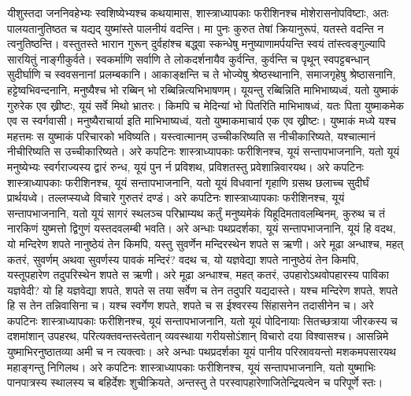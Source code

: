 \adhyAya
{}
\vakya यीशुस्तदा जननिवहेभ्यः स्वशिष्येभ्यश्च कथयामास,
\vakya शास्त्राध्यापकाः फरीशिनश्च मोशेरासनोपविष्टाः, अतः पालयतानुतिष्ठत च यद्यद् युष्मांस्ते पालनीयं वदन्ति।
\vakya मा पुनः कुरुत तेषां क्रियानुरूपं, यतस्ते वदन्ति न त्वनुतिष्ठन्ति।
\vakya वस्तुतस्ते भारान गुरून् दुर्वहांश्च बद्ध्वा स्कन्धेषु मनुष्याणामर्पयन्ति स्वयं तांस्त्वङ्गुल्यापि सारयितुं नाङ्गीकुर्वते।
\vakya स्वकर्माणि सर्वाणि ते लोकदर्शनायैव कुर्वन्ति, कुर्वन्ति च पृथून् स्वपट्टबन्धान् सुदीर्घाणि च स्ववसनानां प्रलम्बकानि।
\vakya आकाङ्क्षन्ति च ते भोज्येषु श्रेष्ठस्थानानि, समाजगृहेषु श्रेष्ठासनानि,
\vakya हट्टेष्वभिवन्दनानि, मनुष्यैश्च भो रब्बिन् भो रब्बिन्नित्यभिभाषणम्।
\vakya यूयन्तु रब्बिन्निति माभिभाष्यध्वं, यतो युष्माकं गुरुरेक एव ख्रीष्टः, यूयं सर्वे मिथो भ्रातरः।
\vakya किमपि च मेदिन्यां भो पितरिति माभिभाषध्वं, यतः पिता युष्माकमेक एव स स्वर्गवासी।
\vakya मनुष्यैराचार्या इति माभिभाष्यध्वं, यतो युष्माकमाचार्य एक एव ख्रीष्टः।
\vakya युष्माकं मध्ये यश्च महत्तमः स युष्माकं परिचारको भविष्यति।
\vakya यस्त्वात्मानम् उच्चीकरिष्यति स नीचीकारिष्यते, यश्चात्मानं नीचीरिष्यति स उच्चीकारिष्यते।
\vakya अरे कपटिनः शास्त्राध्यापकाः फरीशिनश्च, यूयं सन्तापभाजनानि, यतो यूयं मनुष्येभ्यः स्वर्गराज्यस्य द्वारं रुन्ध, यूयं पुन र्न प्रविशथ, प्रविशतस्तु प्रवेशान्निवारयथ।
\vakya अरे कपटिनः शास्त्राध्यापकाः फरीशिनश्च, यूयं सन्तापभाजनानि, यतो यूयं विधवानां गृहाणि ग्रसथ छलाच्च सुदीर्घं प्रार्थयध्वे। तल्लप्स्यध्वे विचारे गुरुतरं दण्डं।
\vakya अरे कपटिनः शास्त्राध्यापकाः फरीशिनश्च, यूयं सन्तापभाजनानि, यतो यूयं सागरं स्थलञ्च परिभ्राम्यथ कर्तुं मनुष्यमेकं यिहूदिमतावलम्बिनम्, कुरुथ च तं नारकिणं युष्मत्तो द्विगुणं यस्तदवलम्बी भवति।
\vakya अरे अन्धाः पथप्रदर्शका, यूयं सन्तापभाजनानि, यूयं हि वदथ, यो मन्दिरेण शपते नानुष्ठेयं तेन किमपि, यस्तु सुवर्णेन मन्दिरस्थेन शपते स ऋणी।
\vakya अरे मूढा अन्धाश्च, महत् कतरं, सुवर्णम् अथवा सुवर्णस्य पावकं मन्दिरं?
\vakya वदथ च, यो यज्ञवेद्या शपते नानुष्ठेयं तेन किमपि, यस्तूपहारेण तदुपरिस्थेन शपते स ऋणी।
\vakya अरे मूढा अन्धाश्च, महत् कतरं, उपहारोऽथवोपहारस्य पाविका यज्ञवेदी?
\vakya यो हि यज्ञवेद्या शपते, शपते स तया सर्वेण च तेन तदुपरि यद्यदास्ते।
\vakya यश्च मन्दिरेण शपते, शपते हि स तेन तन्निवासिना च।
\vakya यश्च स्वर्गेण शपते, शपते च स ईश्वरस्य सिंहासनेन तदासीनेन च।
\vakya अरे कपटिनः शास्त्राध्यापकाः फरीशिनश्च, यूयं सन्तापभाजनानि, यतो यूयं पोदिनायाः सितच्छत्राया जीरकस्य च दशमांशान् उपहरथ, परित्यक्तवन्तस्त्वेतान् व्यवस्थाया गरीयसोऽंशान् विचारो दया विश्वासश्च। आसन्निमे युष्माभिरनुष्ठातव्या अमी च न त्यक्त्वाः।
\vakya अरे अन्धाः पथप्रदर्शका यूयं पानीय परिस्रावयन्तो मशकमपसारयथ महाङ्गन्तु निगिलथ।
\vakya अरे कपटिनः शास्त्राध्यापकाः फरीशिनश्च, यूयं सन्तापभाजनानि, यतो युष्माभिः पानपात्रस्य स्थालस्य च बहिर्देशः शुचीक्रियते, अन्तस्तु ते परस्वापहारेणाजितेन्द्रियत्वेन च परिपूर्णे स्तः।
